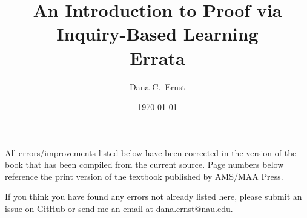 \documentclass[11pt]{article}%
\newcommand{\blankline}{\pagebreak[2]\vspace{.5\baselineskip}}
\begin{document}
\title{An Introduction to Proof via Inquiry-Based Learning\\
Errata}
\author{Dana C.~Ernst}
\date{\today}

\maketitle

All errors/improvements listed below have been corrected in the version of the book that has been compiled from the current source.  Page numbers below reference the print version of the textbook published by AMS/MAA Press.

\blankline

If you think you have found any errors not already listed here, please submit an issue on \href{https://github.com/dcernst/IBL-IntroToProof/issues}{GitHub} or send me an email at \url{dana.ernst@nau.edu}.
\end{document}
